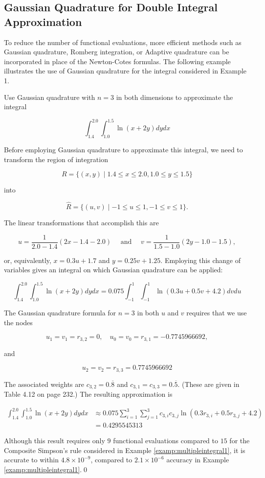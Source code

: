 \subsection*{Gaussian Quadrature for Double Integral Approximation}
To reduce the number of functional evaluations, more efficient methods such as Gaussian quadrature, Romberg integration, or Adaptive quadrature can be incorporated in place of the Newton-Cotes formulas. The following example illustrates the use of Gaussian quadrature for the integral considered in Example 1.

\begin{example}
Use Gaussian quadrature with $n=3$ in both dimensions to approximate the integral

$$
\int_{1.4}^{2.0} \int_{1.0}^{1.5} \ln (x+2 y) d y d x
$$
\end{example}

\begin{mysolution}
Before employing Gaussian quadrature to approximate this integral, we need to transform the region of integration

$$
R=\{(x, y) \mid 1.4 \leq x \leq 2.0,1.0 \leq y \leq 1.5\}
$$

into

$$
\hat{R}=\{(u, v) \mid-1 \leq u \leq 1,-1 \leq v \leq 1\} .
$$

The linear transformations that accomplish this are

$$
u=\frac{1}{2.0-1.4}(2 x-1.4-2.0) \quad \text { and } \quad v=\frac{1}{1.5-1.0}(2 y-1.0-1.5),
$$

or, equivalently, $x=0.3 u+1.7$ and $y=0.25 v+1.25$. Employing this change of variables gives an integral on which Gaussian quadrature can be applied:

$$
\int_{1.4}^{2.0} \int_{1.0}^{1.5} \ln (x+2 y) d y d x=0.075 \int_{-1}^{1} \int_{-1}^{1} \ln (0.3 u+0.5 v+4.2) d v d u
$$

The Gaussian quadrature formula for $n=3$ in both $u$ and $v$ requires that we use the nodes

$$
u_{1}=v_{1}=r_{3,2}=0, \quad u_{0}=v_{0}=r_{3,1}=-0.7745966692,
$$

and

$$
u_{2}=v_{2}=r_{3,3}=0.7745966692
$$

The associated weights are $c_{3,2}=0 . \overline{8}$ and $c_{3,1}=c_{3,3}=0 . \overline{5}$. (These are given in Table 4.12 on page 232.) The resulting approximation is

$$
\begin{aligned}
\int_{1.4}^{2.0} \int_{1.0}^{1.5} \ln (x+2 y) d y d x & \approx 0.075 \sum_{i=1}^{3} \sum_{j=1}^{3} c_{3, i} c_{3, j} \ln \left(0.3 r_{3, i}+0.5 r_{3, j}+4.2\right) \\
& =0.4295545313
\end{aligned}
$$

Although this result requires only $9$ functional evaluations compared to $15$ for the Composite Simpson's rule considered in Example \ref{examp:multipleintegral1}, it is accurate to within $4.8 \times 10^{-9}$, compared to $2.1 \times 10^{-6}$ accuracy in Example \ref{examp:multipleintegral1}.\qed
\end{mysolution}


